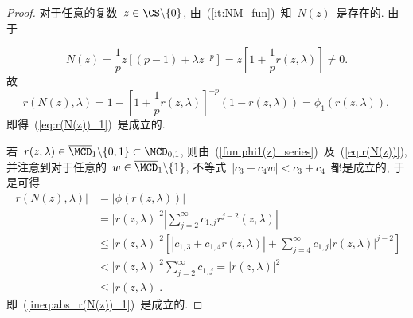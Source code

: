 \begin{proof}


对于任意的复数~$z \in \CS\backslash\{0\}$,
由~(\ref{it:NM_fun})~知~$N(z)$~是存在的. 由于

\begin{equation}
\label{eq:N(z)} N(z) = \frac{1}{p}z\left[(p-1)+\lambda z^{-p}\right]
= z\left[1+\frac{1}{p}r(z,\lambda)\right] \neq 0.
\end{equation}
故
\begin{equation}
\label{eq:r(N(z))} r(N(z),\lambda) =
1-\left[1+\frac{1}{p}r(z,\lambda)\right]^{-p}(1-r(z,\lambda)) =
\phi_1(r(z,\lambda)),
\end{equation}
即得~(\ref{eq:r(N(z))_1})~是成立的.


若~$r(z,\lambda) \in \overline{\MCD}_1\backslash\{0,1\} \subset
\MCD_{0,1}$, 则由~(\ref{fun:phi1(z)_series})~及~(\ref{eq:r(N(z))}),
并注意到对于任意的~$w \in \overline{\MCD}_1\backslash\{1\}$,
不等式~$|c_3 + c_4 w| < c_3 + c_4$~都是成立的, 于是可得
\begin{align}
|r(N(z),\lambda)| & = |\phi(r(z,\lambda))| \nonumber\\
& = |r(z,\lambda)|^2 \left| \sum_{j =
2}^\infty c_{1,j} r^{j-2}(z,\lambda) \right| \nonumber\\
& \leq |r(z,\lambda)|^2 \left[|c_{1,3} + c_{1,4} r(z,\lambda)| +
\sum_{j = 4}^\infty c_{1,j} |r(z,\lambda)|^{j-2}
\right] \nonumber\\
& < |r(z,\lambda)|^2 \sum_{j = 2}^\infty c_{1,j} =
|r(z,\lambda)|^2\nonumber\\
& \leq |r(z,\lambda)|. \label{ineq:abs_r(N(z))}
\end{align}
即~(\ref{ineq:abs_r(N(z))_1})~是成立的.




\end{proof}
